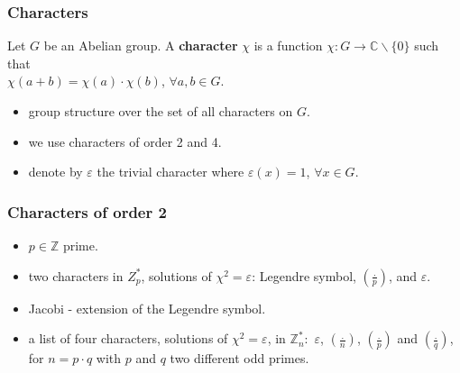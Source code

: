 \documentclass{beamer}
\begin{document}

\begin{frame}
\frametitle{Characters}


 	\begin{definition}
 	Let $G$ be an Abelian group. A \textbf{character} $\chi$ is a function 
 	$\chi : G \rightarrow \mathbb{C} \backslash \{ 0 \}$ such that \\
 	
 	\hspace{30mm}  $\chi(a+b)= \chi(a) \cdot \chi(b)$, $\forall a,b \in G$.
 	\end{definition} 
 	
 	\bigskip
 	
 	\begin{itemize}
 		\item group structure over the set of all characters on $G$. 
 		\item we use characters of order 2 and 4.
 		\item denote by $\varepsilon$ the trivial character
 				where $\varepsilon(x)=1$, $\forall x \in G$.
 	\end{itemize}
 	

\end{frame}


\begin{frame}
\frametitle{Characters of order 2}

	\begin{itemize}
		\item $p \in \mathbb{Z}$ prime.
		
		\item two characters in 
			$Z_p^*$, solutions of $\chi^2= \varepsilon$: Legendre
			symbol, $(\frac{.}{p})$, and $\varepsilon.$
		\item Jacobi - extension of the Legendre symbol.
		\item a list of four characters, solutions of $\chi^2= \varepsilon$, in $\mathbb{Z}_n^*:$ $\varepsilon$, $(\frac{.}{n})$, $(\frac{.}{p})$ and $(\frac{.}{q})$, 
		for $n= p\cdot q$ with $p$ and $q$ two different odd primes.
	\end{itemize}

	
	
\end{frame}

\end{document}
